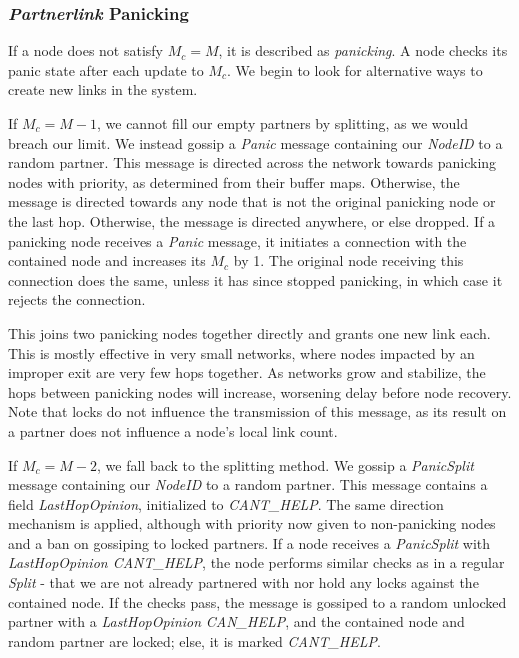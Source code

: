 \documentclass[12pt,a4paper]{article}
\begin{document}
\subsubsection{\textit{Partnerlink} Panicking} \label{css:partnerlink:panicking}
If a node does not satisfy \(M_c = M\), it is described as \textit{panicking}. A node checks its panic state after each update to \(M_c\). We begin to look for alternative ways to create new links in the system.

If \(M_c = M - 1\), we cannot fill our empty partners by splitting, as we would breach our limit. We instead gossip a 
\textit{Panic} message containing our \textit{NodeID} to a random partner. This message is directed across the network towards panicking nodes with priority, as determined from their buffer maps. Otherwise, the message is directed towards any node that is not the original panicking node or the last hop. Otherwise, the message is directed anywhere, or else dropped. If a panicking node receives a \textit{Panic} message, it initiates a connection with the contained node and increases its \(M_c\) by 1. The original node receiving this connection does the same, unless it has since stopped panicking, in which case it rejects the connection.

This joins two panicking nodes together directly and grants one new link each. This is mostly effective in very small networks, where nodes impacted by an improper exit are very few hops together. As networks grow and stabilize, the hops between panicking nodes will increase, worsening delay before node recovery. Note that locks do not influence the transmission of this message, as its result on a partner does not influence a node's local link count.

If \(M_c = M - 2\), we fall back to the splitting method. We gossip a \textit{PanicSplit} message containing our \textit{NodeID} to a random partner. This message contains a field \textit{LastHopOpinion}, initialized to \textit{CANT\_HELP}. The same direction mechanism is applied, although with priority now given to non-panicking nodes and a ban on gossiping to locked partners. If a node receives a \textit{PanicSplit} with \textit{LastHopOpinion CANT\_HELP}, the node performs similar checks as in a regular \textit{Split} - that we are not already partnered with nor hold any locks against the contained node. If the checks pass, the message is gossiped to a random unlocked partner with a \textit{LastHopOpinion} \textit{CAN\_HELP}, and the contained node and random partner are locked; else, it is marked \textit{CANT\_HELP}.
\end{document}

